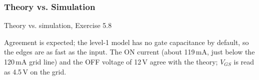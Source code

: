 \subsubsection*{Theory vs. Simulation}
\begin{comparison}{Theory vs. simulation, Exercise 5.8}
\end{comparison}
\begin{solution}
Agreement is expected; the level-1 model has no gate capacitance by default, so the edges are as fast as the input.
The ON current (about 119\,mA, just below the 120\,mA grid line) and the OFF voltage of 12\,V agree with the theory;
$V_{GS}$ is read as 4.5\,V on the grid.
\end{solution}
